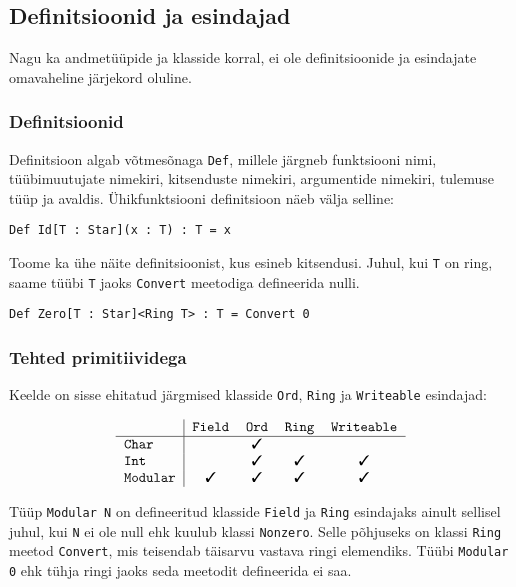 \documentclass[12pt]{article}
\def\linnuke{\ding{51}}
\begin{document}
    \subsection{Definitsioonid ja esindajad}
      Nagu ka andmetüüpide ja klasside korral, ei ole definitsioonide ja esindajate omavaheline järjekord oluline.
      \subsubsection{Definitsioonid}
        Definitsioon algab võtmesõnaga \verb!Def!, millele järgneb funktsiooni nimi, tüübimuutujate nimekiri, kitsenduste nimekiri, argumentide nimekiri, tulemuse tüüp ja avaldis. Ühikfunktsiooni definitsioon näeb välja selline:

        \begin{verbatim}Def Id[T : Star](x : T) : T = x\end{verbatim}

        Toome ka ühe näite definitsioonist, kus esineb kitsendusi. Juhul, kui \verb!T! on ring, saame tüübi \verb!T! jaoks \verb!Convert! meetodiga defineerida nulli.

        \begin{verbatim}Def Zero[T : Star]<Ring T> : T = Convert 0\end{verbatim}
      \subsubsection{Tehted primitiividega}\label{tehtedprim}
        Keelde on sisse ehitatud järgmised klasside \verb!Ord!, \verb!Ring! ja \verb!Writeable! esindajad:

        \begin{equation*}
          \begin{tabular}{l|cccc}
                           & \verb!Field! & \verb!Ord! & \verb!Ring! & \verb!Writeable! \\\hline
            \verb!Char!    &              & \linnuke   &             &                  \\
            \verb!Int!     &              & \linnuke   & \linnuke    & \linnuke         \\
            \verb!Modular! & \linnuke     & \linnuke   & \linnuke    & \linnuke
          \end{tabular}
        \end{equation*}

        Tüüp \verb!Modular N! on defineeritud klasside \verb!Field! ja \verb!Ring! esindajaks ainult sellisel juhul, kui \verb!N! ei ole null ehk kuulub klassi \verb!Nonzero!. Selle põhjuseks on klassi \verb!Ring! meetod \verb!Convert!, mis teisendab täisarvu vastava ringi elemendiks. Tüübi \verb!Modular 0! ehk tühja ringi jaoks seda meetodit defineerida ei saa.
\end{document}
